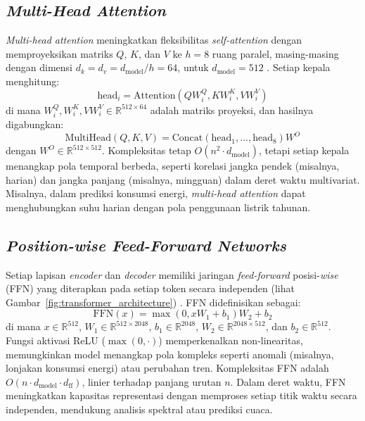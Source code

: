 \subsection{\textit{Multi-Head Attention}}

\textit{Multi-head attention} meningkatkan fleksibilitas \textit{self-attention} dengan memproyeksikan matriks \( Q \), \( K \), dan \( V \) ke \( h=8 \) ruang paralel, masing-masing dengan dimensi \( d_k = d_v = d_{\text{model}} / h = 64 \), untuk \( d_{\text{model}} = 512 \) \citep{Vaswani2017}. Setiap kepala menghitung:
\begin{equation}
\text{head}_i = \text{Attention}(Q W_i^Q, K W_i^K, V W_i^V) \label{eq:bab2_eq37}
\end{equation}
di mana \( W_i^Q, W_i^K, V W_i^V \in \mathbb{R}^{512 \times 64} \) adalah matriks proyeksi, dan hasilnya digabungkan:
\begin{equation}
\text{MultiHead}(Q, K, V) = \text{Concat}(\text{head}_1, \ldots, \text{head}_8) W^O \label{eq:bab2_eq38}
\end{equation}
dengan \( W^O \in \mathbb{R}^{512 \times 512} \). Kompleksitas tetap \( O(n^2 \cdot d_{\text{model}}) \), tetapi setiap kepala menangkap pola temporal berbeda, seperti korelasi jangka pendek (misalnya, harian) dan jangka panjang (misalnya, mingguan) dalam deret waktu multivariat. Misalnya, dalam prediksi konsumsi energi, \textit{multi-head attention} dapat menghubungkan suhu harian dengan pola penggunaan listrik tahunan.

\subsection{\textit{Position-wise Feed-Forward Networks}}

Setiap lapisan \textit{encoder} dan \textit{decoder} memiliki jaringan \textit{feed-forward} posisi-\textit{wise} (FFN) yang diterapkan pada setiap token secara independen (lihat Gambar~\ref{fig:transformer_architecture}) \citep{Vaswani2017}. FFN didefinisikan sebagai:
\begin{equation}
\text{FFN}(x) = \max(0, x W_1 + b_1) W_2 + b_2 \label{eq:bab2_eq39}
\end{equation}
di mana \( x \in \mathbb{R}^{512} \), \( W_1 \in \mathbb{R}^{512 \times 2048} \), \( b_1 \in \mathbb{R}^{2048} \), \( W_2 \in \mathbb{R}^{2048 \times 512} \), dan \( b_2 \in \mathbb{R}^{512} \). Fungsi aktivasi ReLU (\(\max(0, \cdot)\)) memperkenalkan non-linearitas, memungkinkan model menangkap pola kompleks seperti anomali (misalnya, lonjakan konsumsi energi) atau perubahan tren. Kompleksitas FFN adalah \( O(n \cdot d_{\text{model}} \cdot d_{\text{ff}}) \), linier terhadap panjang urutan \( n \). Dalam deret waktu, FFN meningkatkan kapasitas representasi dengan memproses setiap titik waktu secara independen, mendukung analisis spektral atau prediksi cuaca.

